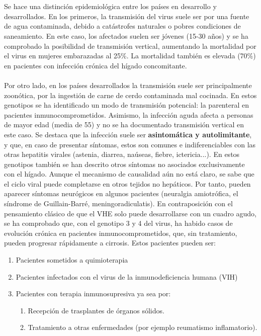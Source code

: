 \documentclass[11 pt]{article}
\begin{document}
\\\\Se hace una distinción epidemiológica entre los países en desarrollo y desarrollados. En los primeros, la transmisión del virus suele ser por una fuente de agua contaminada, debido a catástrofes naturales o pobres condiciones de saneamiento. En este caso, los afectados suelen ser jóvenes (15-30 años) y se ha comprobado la posibilidad de transmisión vertical, aumentando la mortalidad por el virus en mujeres embarazadas al 25\%. La mortalidad también es elevada (70\%) en pacientes con infección crónica del hígado concomitante.\\\\ Por otro lado, en los países desarrollados la transmisión suele ser principalmente zoonótica, por la ingestión de carne de cerdo contaminada mal cocinada. En estos genotipos se ha identificado un modo de transmisión potencial: la parenteral en pacientes inmunocomprometidos. Asimismo, la infección aguda afecta a personas de mayor edad (media de 55) y no se ha documentado transmisión vertical en este caso. Se destaca que la infección suele ser {\bf asintomática y autolimitante}, y que, en caso de presentar síntomas, estos son comunes e indiferenciables con las otras hepatitis virales (astenia, diarrea, naúseas, fiebre, ictericia...). En estos genotipos también se han descrito otros síntomas no asociados exclusivamente con el hígado. Aunque el mecanismo de causalidad aún no está claro, se sabe que el ciclo viral puede completarse en otros tejidos no hepáticos. Por tanto, pueden aparecer síntomas neurógicos en algunos pacientes (neuralgia amiotrófica, el síndrome de Guillain-Barré, meningoradiculatis). En contraposición con el pensamiento clásico de que el VHE solo puede desarrollarse con un cuadro agudo, se ha comprobado que, con el genotipo 3 y 4 del virus, ha habido casos de evolución crónica en pacientes inmunocomprometidos, que, sin tratamiento, pueden progresar rápidamente a cirrosis. Estos pacientes pueden ser: 
\begin{enumerate} 
\item Pacientes sometidos a quimioterapia
\item Pacientes infectados con el virus de la inmunodeficiencia humana (VIH) 
\item Pacientes con terapia inmunosupresiva ya sea por: 
\begin{enumerate}
	\item Recepción de trasplantes de órganos sólidos.
	\item Tratamiento a otras enfermedades (por ejemplo reumatismo inflamatorio).
\end{enumerate}
\end{enumerate}
\end{document}
